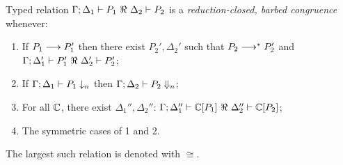 \begin{definition}\rm
\label{def:rc}
	Typed relation
	$\horel{\Gamma}{\Delta_1}{P_1}{\ \Re\ }{\Delta_2}{P_2}$
	is a {\em reduction-closed, barbed congruence} whenever:
	\begin{enumerate}[1)]
		\item	If $P_1 \longrightarrow P_1'$ then there exist $P_2', \Delta_2'$ such that $P_2 \longrightarrow^* P_2'$ and
			$\horel{\Gamma}{\Delta_1'}{P_1'}{\ \Re\ }{\Delta_2'}{P_2'}$;%

			\item	If $\Gamma;\Delta_1 \vdash P_1 \downarrow_{n}$ then $\Gamma;\Delta_2 \vdash P_2 \Downarrow_{n}$;%


		\item	For all ${\Bbb C}$, there exist $\Delta_1'',\Delta_2''$: $\horel{\Gamma}{\Delta_1''}{\context{\C}{P_1}}{\ \Re\ }{\Delta_2''}{\context{\C}{P_2}}$; 
		                      \item	The symmetric cases of 1 and 2.                
	\end{enumerate}
	The largest such relation is denoted with $\cong$.
\end{definition}


